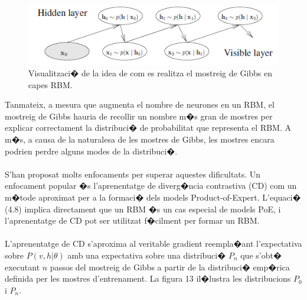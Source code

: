 \documentclass[12pt,a4paper,openright,oneside]{article}
\numberwithin{equation}{section}
\theoremstyle{definition}
\begin{document}
\begin{figure}[h!]
\begin{center}
\includegraphics[width=\textwidth]{rbm_hidden}
\caption{Visualitzaci� de la idea de com es realitza el mostreig de Gibbs en capes RBM.}
\end{center}
\end{figure}
Tanmateix, a mesura que augmenta el nombre de neurones en un RBM, el mostreig de Gibbs hauria de recollir un nombre m�s gran de mostres per explicar correctament la distribuci� de probabilitat que representa el RBM. A m�s, a causa de la naturalesa de les mostres de Gibbs, les mostres encara podrien perdre alguns modes de la distribuci�.\\\\
S'han proposat molts enfocaments per superar aquestes dificultats. Un enfocament popular �s l'aprenentatge de diverg�ncia contrastiva (CD) com un m�tode aproximat per a la formaci� dels models Product-of-Expert. L'equaci� (4.8) implica directament que un RBM �s un cas especial de models PoE, i l'aprenentatge de CD pot ser utilitzat f�cilment per formar un RBM.\\\\
L'aprenentatge de CD s'aproxima al veritable gradient reempla�ant l'expectativa sobre ${P(v,h | \theta)}$ amb una expectativa sobre una distribuci� ${P_n}$ que s'obt� executant ${n}$ passos del mostreig de Gibbs a partir de la distribuci� emp�rica definida per les mostres d'entrenament. La figura 13 il�lustra les distribucions ${P_0}$ i ${P_n}$.
\end{document}
